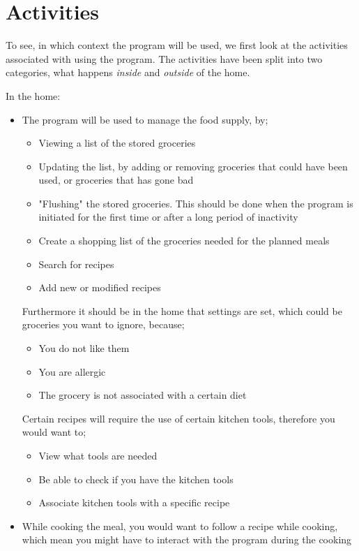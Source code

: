 \section{Activities}
To see, in which context the program will be used, we first look at the activities associated with using the program. The activities have been split into two categories, what happens \textit{inside} and \textit{outside} of the home.

In the home:
\begin{itemize}
\item The program will be used to manage the food supply, by;
	\begin{itemize}
		\item Viewing a list of the stored groceries
		\item Updating the list, by adding or removing groceries that could have been used, or groceries that has gone bad
		\item "Flushing" the stored groceries. This should be done when the program is initiated for the first time or after a long period of inactivity
		\item Create a shopping list of the groceries needed for the planned meals
		\item Search for recipes
		\item Add new or modified recipes
	\end{itemize}
	Furthermore it should be in the home that settings are set, which could be groceries you want to ignore, because;
	\begin{itemize}
		\item You do not like them
		\item You are allergic
		\item The grocery is not associated with a certain diet
	\end{itemize}
	Certain recipes will require the use of certain kitchen tools, therefore you would want to;
	\begin{itemize}
		\item View what tools are needed
		\item Be able to check if you have the kitchen tools
		\item Associate kitchen tools with a specific recipe
	\end{itemize}
	\item While cooking the meal, you would want to follow a recipe while cooking, which mean you might have to interact with the program during the cooking
\end{itemize}

